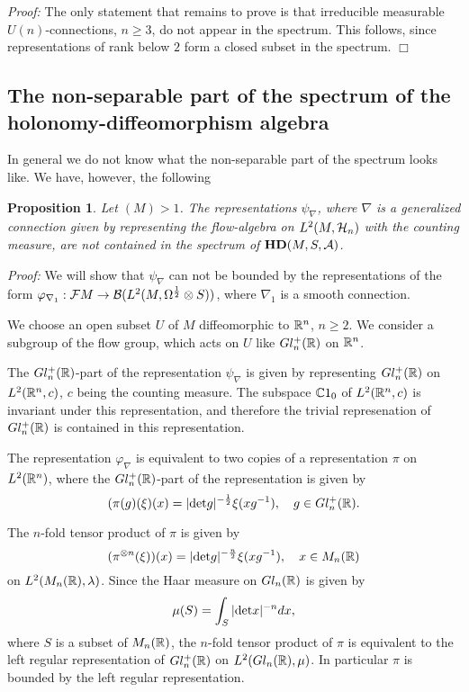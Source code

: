 \documentclass[12pt]{article}
\def\ca{{\cal A}}
\def\cb{{\cal B}}
\def\cf{{\cal F}}
\def\ch{{\cal H}}
\newtheorem{proposition}[thm]{Proposition}
\newcommand{\bbC}{{\Bbb C}}
\newcommand{\bbR}{{\Bbb R}}
\begin{document}
\textit{Proof:} The only statement that remains to prove is that irreducible measurable $U(n)$-connections, $n\geq 3$, do not appear in the spectrum. This follows, since representations of rank below $2$ form a closed subset in the spectrum. \hfill $\Box$ \\ 




\subsection{The non-separable part of the spectrum of the holonomy-diffeomorphism algebra}

In general we do not know what the non-separable part of the spectrum looks like. We have, however, the following
\begin{proposition}
Let $(M)>1$. The representations $\psi_\nabla $, where $\nabla$ is a generalized connection  given by representing the flow-algebra on $L^2(M,\ch_n)$ with the counting measure,  are not contained in the spectrum of $\mathbf{H D} (M,S,\ca)$.
\end{proposition}

\textit{Proof:} We will show that $\psi_\nabla$ can not be bounded by  the representations of the form $\varphi_{\nabla_1}: \cf M \to \cb (L^2 (M,\Omega^{\frac12}\otimes S)) $, where $\nabla_1$ is a smooth connection. 

We choose an open subset $U$ of $M$ diffeomorphic to $\bbR^n$, $n\geq 2$.%
 We consider a subgroup of the flow group, which acts on $U$ like $Gl_n^+(\bbR)$ on $\bbR^n$. 

The $Gl_n^+(\bbR)$-part of the representation $\psi_\nabla$ is given by representing $Gl_n^+(\bbR)$ on $L^2(\bbR^n, c)$, $c$ being the counting measure. The subspace $\bbC 1_0$ of $L^2(\bbR^n, c)$ is invariant under this representation, and therefore the trivial represenation of $Gl_n^+(\bbR)$ is contained in this representation.

The representation $\varphi_\nabla$ is equivalent to two copies of  a representation $\pi$ on $L^2(\bbR^n)$, where the $Gl_n^+(\bbR)$-part of the representation is  given by 
 $$ (\pi(g)(\xi)(x)=|\hbox{det}g|^{-\frac12} \xi ( xg^{-1} ), \quad g\in Gl_n^+(\bbR) .   $$     


 
The $n$-fold tensor product of $\pi$ is given by
$$  (\pi^{\otimes n} (\xi))(x)=  |\hbox{det}g|^{-\frac{n}{2}} \xi (xg^{-1}), \quad x\in M_n(\bbR) $$
on $L^2(M_n(\bbR), \lambda )$. Since the Haar measure on $Gl_n(\bbR) $ 
is given by 
$$\mu (S) =\int_S |\hbox{det}x|^{-n} dx,      $$
where $S$ is a subset of $M_n(\bbR)$, the $n$-fold tensor product of $\pi$ is equivalent to the left regular representation of $Gl_n^+(\bbR)$ on $L^2(Gl_n(\bbR), \mu )$. In particular $\pi$ is bounded by the left regular representation. 
\end{document}
